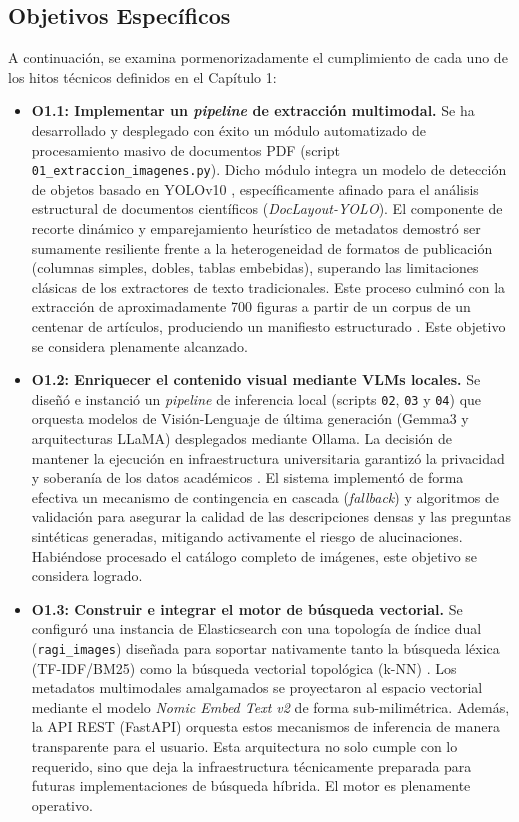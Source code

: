 \documentclass[a4paper]{report}
\begin{document}
\subsection{Objetivos Específicos}
\label{subsec:objetivos_especificos}

A continuación, se examina pormenorizadamente el cumplimiento de cada uno de los hitos técnicos definidos en el Capítulo 1:

\begin{itemize}
    \item \textbf{O1.1: Implementar un \textit{pipeline} de extracción multimodal.} Se ha desarrollado y desplegado con éxito un módulo automatizado de procesamiento masivo de documentos PDF (script \texttt{01\_extraccion\_imagenes.py}). Dicho módulo integra un modelo de detección de objetos basado en YOLOv10 \cite{wang2024yolov10}, específicamente afinado para el análisis estructural de documentos científicos (\textit{DocLayout-YOLO}). El componente de recorte dinámico y emparejamiento heurístico de metadatos demostró ser sumamente resiliente frente a la heterogeneidad de formatos de publicación (columnas simples, dobles, tablas embebidas), superando las limitaciones clásicas de los extractores de texto tradicionales. Este proceso culminó con la extracción de aproximadamente 700 figuras a partir de un corpus de un centenar de artículos, produciendo un manifiesto estructurado \cite{clark2016pdffigures}. Este objetivo se considera plenamente alcanzado.

    \item \textbf{O1.2: Enriquecer el contenido visual mediante VLMs locales.} Se diseñó e instanció un \textit{pipeline} de inferencia local (scripts \texttt{02}, \texttt{03} y \texttt{04}) que orquesta modelos de Visión-Lenguaje de última generación (Gemma3 y arquitecturas LLaMA) desplegados mediante Ollama. La decisión de mantener la ejecución en infraestructura universitaria garantizó la privacidad y soberanía de los datos académicos \cite{touvron2023}. El sistema implementó de forma efectiva un mecanismo de contingencia en cascada (\textit{fallback}) y algoritmos de validación para asegurar la calidad de las descripciones densas y las preguntas sintéticas generadas, mitigando activamente el riesgo de alucinaciones. Habiéndose procesado el catálogo completo de imágenes, este objetivo se considera logrado.

    \item \textbf{O1.3: Construir e integrar el motor de búsqueda vectorial.} Se configuró una instancia de Elasticsearch con una topología de índice dual (\texttt{ragi\_images}) diseñada para soportar nativamente tanto la búsqueda léxica (TF-IDF/BM25) como la búsqueda vectorial topológica (k-NN) \cite{manning2008introduction}. Los metadatos multimodales amalgamados se proyectaron al espacio vectorial mediante el modelo \textit{Nomic Embed Text v2} \cite{nussbaum2024nomic} de forma sub-milimétrica. Además, la API REST (FastAPI) orquesta estos mecanismos de inferencia de manera transparente para el usuario. Esta arquitectura no solo cumple con lo requerido, sino que deja la infraestructura técnicamente preparada para futuras implementaciones de búsqueda híbrida. El motor es plenamente operativo.


\end{itemize}
\end{document}
